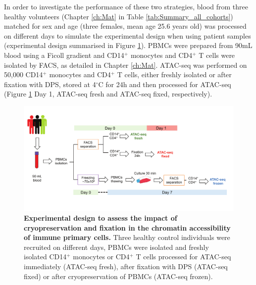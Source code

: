 In order to investigate the performance of these two strategies, blood from three healthy volunteers (Chapter \ref{ch:Mat} in Table \ref{tab:Summary_all_cohorts}) matched for sex and age (three females, mean age 25.6 years old) was processed on different days to simulate the experimental design when using patient samples (experimental design summarised in Figure \ref{figure:Core_experimental_design}). PBMCs were prepared from 90mL blood using a Ficoll gradient and CD14$^+$ monocytes and CD4$^+$ T cells were isolated by FACS, as detailed in Chapter \ref{ch:Mat}. ATAC-seq was performed on 50,000 CD14$^+$ monocytes and CD4$^+$ T cells, either freshly isolated or after fixation with DPS, stored at 4{$^\circ$}C for 24h and then processed for ATAC-seq (Figure \ref{figure:Core_experimental_design} Day 1, ATAC-seq fresh and ATAC-seq fixed, respectively). 

\begin{landscape}
\begin{figure}[H]
\centering
\includegraphics[width=1.2\textwidth]{./Results1/pdfs/Chapter3_core_experimental_design}
\caption[Experimental design to assess the impact of cryopreservation and fixation in the chromatin accessibility of immune primary cells.]{\textbf{Experimental design to assess the impact of cryopreservation and fixation in the chromatin accessibility of immune primary cells.} Three healthy control individuals were recruited on different days, PBMCs were isolated and freshly isolated CD14$^+$ monocytes or CD4$^+$ T cells processed for ATAC-seq immediately (ATAC-seq fresh), after fixation with DPS (ATAC-seq fixed) or after cryopreservation of PBMCs (ATAC-seq frozen).}%
\label{figure:Core_experimental_design}
\end{figure}
\end{landscape}

